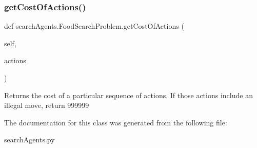 \subsubsection{\texorpdfstring{get\+Cost\+Of\+Actions()}{getCostOfActions()}}
{\footnotesize\ttfamily def search\+Agents.\+Food\+Search\+Problem.\+get\+Cost\+Of\+Actions (\begin{DoxyParamCaption}\item[{}]{self,  }\item[{}]{actions }\end{DoxyParamCaption})}

\begin{DoxyVerb}Returns the cost of a particular sequence of actions.  If those actions
include an illegal move, return 999999\end{DoxyVerb}
 

The documentation for this class was generated from the following file\+:\begin{DoxyCompactItemize}
\item 
search\+Agents.\+py\end{DoxyCompactItemize}
